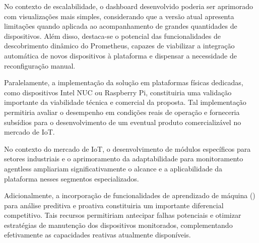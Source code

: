 No contexto de escalabilidade, o dashboard desenvolvido poderia ser aprimorado com visualizações mais simples, considerando que a versão atual apresenta limitações quando aplicada ao acompanhamento de grandes quantidades de dispositivos. Além disso, destaca-se o potencial das funcionalidades de descobrimento dinâmico do Prometheus, capazes de viabilizar a integração automática de novos dispositivos à plataforma e dispensar a necessidade de reconfiguração manual.

Paralelamente, a implementação da solução em plataformas físicas dedicadas, como dispositivos Intel NUC ou Raspberry Pi, constituiria uma validação importante da viabilidade técnica e comercial da proposta. Tal implementação permitiria avaliar o desempenho em condições reais de operação e forneceria subsídios para o desenvolvimento de um eventual produto comercializável no mercado de IoT.

No contexto do mercado de IoT, o desenvolvimento de módulos específicos para setores industriais e o aprimoramento da adaptabilidade para monitoramento agentless ampliariam significativamente o alcance e a aplicabilidade da plataforma nesses segmentos especializados.

Adicionalmente, a incorporação de funcionalidades de aprendizado de máquina () para análise preditiva e proativa constituiria um importante diferencial competitivo. Tais recursos permitiriam antecipar falhas potenciais e otimizar estratégias de manutenção dos dispositivos monitorados, complementando efetivamente as capacidades reativas atualmente disponíveis.

